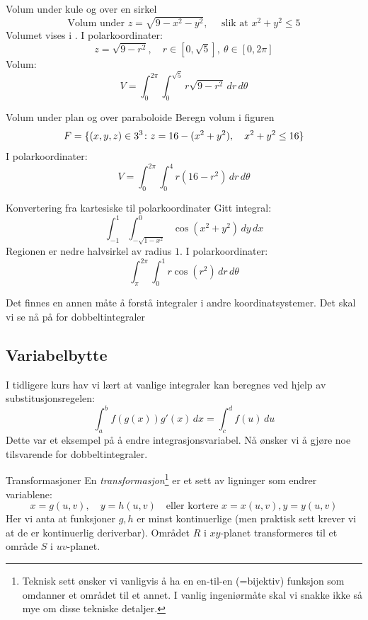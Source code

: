 \begin{eks}{Volum under kule og over en sirkel} 
\[\text{Volum under }
z = \sqrt{9 - x^2 - y^2}, \quad \text{ slik at }x^2 + y^2 \leq 5
\]
Volumet vises i . I polarkoordinater:
\[
z = \sqrt{9 - r^2}, \quad r \in [0, \sqrt{5}],\ \theta \in [0, 2\pi]
\]
Volum:
\[
V = \int_0^{2\pi} \int_0^{\sqrt{5}} r \sqrt{9 - r^2} \, dr\, d\theta
\]\label{syl:sph:inter}
\end{eks}
\begin{eks}{Volum under plan og over paraboloide}
Beregn volum i figuren
\[
F=\{(x,y,z) \in 3^3 \colon z = 16 - (x^2 + y^2), \quad x^2 + y^2 \leq 16\}
\]
I polarkoordinater:
\[
V = \int_0^{2\pi} \int_0^4 r(16 - r^2) \, dr\, d\theta
\]
\end{eks}
\begin{eks}{Konvertering fra kartesiske til polarkoordinater}
Gitt integral:
\[
\int_{-1}^1 \int_{-\sqrt{1 - x^2}}^0 \cos(x^2 + y^2)\, dy\, dx
\]
Regionen er nedre halvsirkel av radius $1$. I polarkoordinater:
\[
\int_\pi^{2\pi} \int_0^1 r \cos(r^2) \, dr\, d\theta
\]
\end{eks}

Det finnes en annen måte å forstå integraler i andre koordinatsystemer. Det skal vi se nå på for dobbeltintegraler

\subsection*{Variabelbytte}
I tidligere kurs hav vi lært at vanlige integraler kan beregnes ved hjelp av substitusjonsregelen:
\[
\int_a^b f(g(x)) g'(x)\, dx = \int_c^d f(u)\, du
\]
Dette var et eksempel på å endre integrasjonsvariabel. Nå ønsker vi å gjøre noe tilsvarende for dobbeltintegraler.

\begin{defn}{Transformasjoner}
En \emph{transformasjon}\footnote{Teknisk sett ønsker vi vanligvis å ha en en-til-en (=bijektiv) funksjon som omdanner et området til et annet. I vanlig ingeniørmåte skal vi snakke ikke så mye om disse tekniske detaljer.} er et sett av ligninger som endrer variablene:
\[
x = g(u, v), \quad y = h(u, v)\quad \text{eller kortere } x=x(u,v), y=y(u,v)
\]
Her vi anta at funksjoner $g,h$ er minst kontinuerlige (men praktisk sett krever vi at de er kontinuerlig deriverbar). Området $R$ i $xy$-planet transformeres til et område $S$ i $uv$-planet. 
\end{defn}

